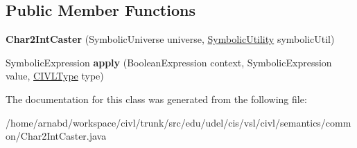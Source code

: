 \subsection*{Public Member Functions}
\begin{DoxyCompactItemize}
\item 
\hypertarget{classedu_1_1udel_1_1cis_1_1vsl_1_1civl_1_1semantics_1_1common_1_1Char2IntCaster_a95403179a35d330d86dab842e91ba9d7}{}{\bfseries Char2\+Int\+Caster} (Symbolic\+Universe universe, \hyperlink{interfaceedu_1_1udel_1_1cis_1_1vsl_1_1civl_1_1dynamic_1_1IF_1_1SymbolicUtility}{Symbolic\+Utility} symbolic\+Util)\label{classedu_1_1udel_1_1cis_1_1vsl_1_1civl_1_1semantics_1_1common_1_1Char2IntCaster_a95403179a35d330d86dab842e91ba9d7}

\item 
\hypertarget{classedu_1_1udel_1_1cis_1_1vsl_1_1civl_1_1semantics_1_1common_1_1Char2IntCaster_a47bfe02f670a2fbded59e7bbf0327165}{}Symbolic\+Expression {\bfseries apply} (Boolean\+Expression context, Symbolic\+Expression value, \hyperlink{interfaceedu_1_1udel_1_1cis_1_1vsl_1_1civl_1_1model_1_1IF_1_1type_1_1CIVLType}{C\+I\+V\+L\+Type} type)\label{classedu_1_1udel_1_1cis_1_1vsl_1_1civl_1_1semantics_1_1common_1_1Char2IntCaster_a47bfe02f670a2fbded59e7bbf0327165}

\end{DoxyCompactItemize}


The documentation for this class was generated from the following file\+:\begin{DoxyCompactItemize}
\item 
/home/arnabd/workspace/civl/trunk/src/edu/udel/cis/vsl/civl/semantics/common/Char2\+Int\+Caster.\+java\end{DoxyCompactItemize}
